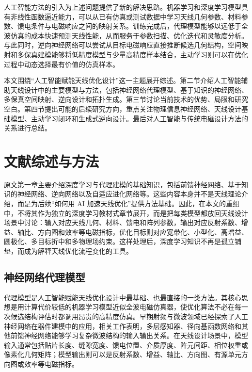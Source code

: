 \documentclass[UTF8,a4paper,12pt]{ctexart}
\begin{document}
人工智能方法的引入为上述问题提供了新的解决思路。机器学习和深度学习模型具有非线性函数逼近能力，可以从已有仿真或测试数据中学习天线几何参数、材料参数、馈电条件与电磁响应之间的映射关系。训练完成后，代理模型能够以远低于全波仿真的成本快速预测天线性能，从而服务于参数扫描、优化迭代和灵敏度分析。与此同时，逆向神经网络可以尝试从目标电磁响应直接推断候选几何结构，空间映射和多保真建模能够将低精度模型与少量高精度样本结合，主动学习则可以在优化过程中动态选择最有价值的仿真样本\cite{sarker2023applications,khan2022review,katkevicius2022trends,tang2026review}。

本文围绕“人工智能赋能天线优化设计”这一主题展开综述。第二节介绍人工智能辅助天线设计中的主要模型与方法，包括神经网络代理模型、基于知识的神经网络、多保真空间映射、逆向设计和拓扑生成。第三节讨论当前技术的优势、局限和研究空白。第四节提出可能的后续研究方向，重点关注物理信息神经网络、天线设计基础模型、主动学习闭环和生成式逆向设计。最后对人工智能与传统电磁设计方法的关系进行总结。

\section{文献综述与方法}

原文第一章主要介绍深度学习与代理建模的基础知识，包括前馈神经网络、基于知识的神经网络、逆向网络以及自适应进化网络等。这些内容本身并不是天线理论介绍，而是为后续“如何用 AI 加速天线优化”提供方法基础。因此，在本文的重组中，不将其作为独立的深度学习教材式章节展开，而是把每类模型都放回天线设计场景中讨论：输入对应天线几何、材料、馈电和阵列参数，输出对应反射系数、增益、轴比、方向图和效率等电磁指标，优化目标则对应宽带化、小型化、高增益、圆极化、多目标折中和多物理场约束。这样处理后，深度学习知识不再是孤立铺垫，而成为解释天线优化流程变化的工具。

\subsection{神经网络代理模型}

代理模型是人工智能赋能天线优化设计中最基础、也最直接的一类方法。其核心思想是用计算代价较低的机器学习模型近似全波电磁仿真器，使优化算法不必在每一次候选结构评估时都调用昂贵的高精度仿真。早期射频与微波领域已经探索了人工神经网络在器件建模中的应用，相关工作表明，多层感知器、径向基函数网络和其他前馈神经网络能够学习复杂微波结构的输入输出关系\cite{zhang2000neural,watson1996emann,watson1999kbann,wang1997kbnn}。在天线设计场景中，模型输入通常包括贴片长度、缝隙宽度、馈电位置、介质厚度、阵元间距、相位权重或像素化几何矩阵；模型输出则可以是反射系数、增益、轴比、方向图、有源单元方向图或效率等电磁指标。
\end{document}

